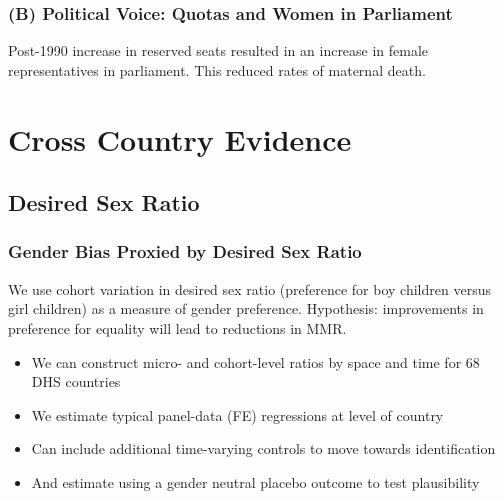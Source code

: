 \documentclass[10pt,letterpaper,subeqn]{beamer}
\begin{document}
\begin{frame}
\frametitle{(B) Political Voice: Quotas and Women in Parliament}
Post-1990 increase in reserved seats resulted in an increase in female
representatives in parliament.  This reduced rates of maternal death.
\end{frame}




\section{Cross Country Evidence}


\subsection{Desired Sex Ratio}

\begin{frame}
\frametitle{Gender Bias Proxied by Desired Sex Ratio}
We use cohort variation in desired sex ratio (preference for boy children versus
girl children) as a measure of gender preference.  Hypothesis: improvements in
preference for equality will lead to reductions in MMR.
\vspace{3mm}
\begin{itemize}
\setlength{\itemsep}{15pt}
\item We can construct micro- and cohort-level ratios by space and time
  for 68 DHS countries
\item We estimate typical panel-data (FE) regressions at level of country
\item Can include additional time-varying controls to move towards identification
\item And estimate using a gender neutral placebo outcome to test plausibility
\end{itemize}
\end{frame}
\end{document}

